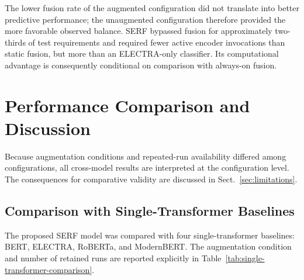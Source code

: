 \documentclass[runningheads]{llncs}
\begin{document}
\begin{table}[!h]
\caption{Active-encoder complexity under different inference strategies.}\label{tab:active-encoder-complexity}
\centering
\setlength{\tabcolsep}{4pt}
\scriptsize
{}
\end{table}

The lower fusion rate of the augmented configuration did not translate into better predictive performance; the unaugmented configuration therefore provided the more favorable observed balance. SERF bypassed fusion for approximately two-thirds of test requirements and required fewer active encoder invocations than static fusion, but more than an ELECTRA-only classifier. Its computational advantage is consequently conditional on comparison with always-on fusion.

\section{Performance Comparison and Discussion}\label{sec:performance-comparison}

Because augmentation conditions and repeated-run availability differed among configurations, all cross-model results are interpreted at the configuration level. The consequences for comparative validity are discussed in Sect.~\ref{sec:limitations}.

\subsection{Comparison with Single-Transformer Baselines}\label{sec:single-transformer-comparison}

The proposed SERF model was compared with four single-transformer baselines: BERT, ELECTRA, RoBERTa, and ModernBERT. The augmentation condition and number of retained runs are reported explicitly in Table~\ref{tab:single-transformer-comparison}.
\end{document}
